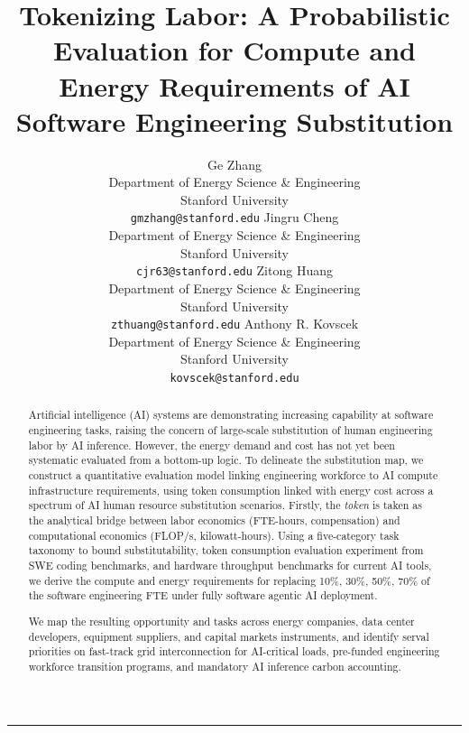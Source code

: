 \documentclass{article}
\title{%
  \textbf{Tokenizing Labor: A Probabilistic Evaluation for Compute and Energy Requirements of AI Software Engineering Substitution}
}
\author{%
  Ge Zhang \\
  Department of Energy Science \& Engineering \\
  Stanford University \\
  \texttt{gmzhang@stanford.edu}
  \And
  Jingru Cheng \\
  Department of Energy Science \& Engineering \\
  Stanford University \\
  \texttt{cjr63@stanford.edu}
  \And
  Zitong Huang \\
  Department of Energy Science \& Engineering \\
  Stanford University \\
  \texttt{zthuang@stanford.edu}
  \And
  Anthony R. Kovscek \\
  Department of Energy Science \& Engineering \\
  Stanford University \\
  \texttt{kovscek@stanford.edu}
}
\date{}
\newcommand{\PRIMARY}{\textbf{[PRIMARY]}}
\newcommand{\SECONDARY}{\textbf{[SECONDARY]}}
\newcommand{\ESTIMATE}{\textbf{[ESTIMATE]}}
\newcommand{\VERIFY}{\textcolor{red}{\textbf{[VERIFY]}}}
\begin{document}
\maketitle


\vspace{1em}
\hrule
\vspace{1em}



\begin{abstract}
Artificial intelligence (AI) systems are demonstrating increasing capability at software engineering tasks, raising the concern of large-scale substitution of human engineering labor by AI inference. However, the energy demand and cost has not yet been systematic evaluated from a bottom-up logic. To delineate the substitution map, we construct a quantitative evaluation model linking engineering workforce to AI compute infrastructure requirements, using token consumption linked with energy cost across a spectrum of AI human resource substitution scenarios. Firstly, the \emph{token} is taken as the analytical bridge between labor economics (FTE-hours, compensation) and computational economics (FLOP/s, kilowatt-hours). Using a five-category task taxonomy to bound substitutability, token consumption evaluation experiment from SWE coding benchmarks, and hardware throughput benchmarks for current AI tools, we derive the compute and energy requirements for replacing 10\%, 30\%, 50\%, 70\% of the software engineering FTE under fully software agentic AI deployment. 

We map the resulting opportunity and tasks across energy companies, data center developers, equipment suppliers, and capital markets instruments, and identify serval priorities on fast-track grid interconnection for AI-critical loads, pre-funded engineering workforce transition programs, and mandatory AI inference carbon accounting.



\end{abstract}
\end{document}
